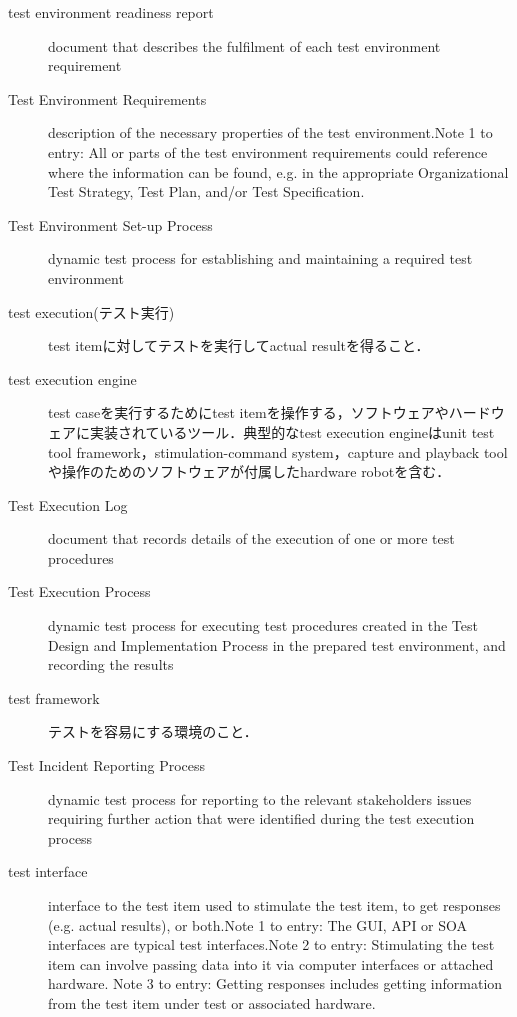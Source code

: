\begin{description}
    \item[test environment readiness report]document that describes the fulfilment of each test environment requirement
    \item[Test Environment Requirements]description of the necessary properties of the test environment.Note 1 to entry: All or parts of the test environment requirements could reference where the information can be found, e.g. in the appropriate Organizational Test Strategy, Test Plan, and/or Test Specification.
    \item[Test Environment Set-up Process]dynamic test process for establishing and maintaining a required test environment
    \item[test execution(テスト実行)]test itemに対してテストを実行してactual resultを得ること．
    \item[test execution engine]test caseを実行するためにtest itemを操作する，ソフトウェアやハードウェアに実装されているツール．典型的なtest execution engineはunit test tool framework，stimulation-command system，capture and playback toolや操作のためのソフトウェアが付属したhardware robotを含む．
    \item[Test Execution Log]document that records details of the execution of one or more test procedures
    \item[Test Execution Process]dynamic test process for executing test procedures created in the Test Design and Implementation Process in the prepared test environment, and recording the results
    \item[test framework]テストを容易にする環境のこと．
    \item[Test Incident Reporting Process]dynamic test process for reporting to the relevant stakeholders issues requiring further action that were identified during the test execution process
    \item[test interface]interface to the test item used to stimulate the test item, to get responses (e.g. actual results), or both.Note 1 to entry: The GUI, API or SOA interfaces are typical test interfaces.Note 2 to entry: Stimulating the test item can involve passing data into it via computer interfaces or attached hardware. Note 3 to entry: Getting responses includes getting information from the test item under test or associated hardware.

\end{description}

